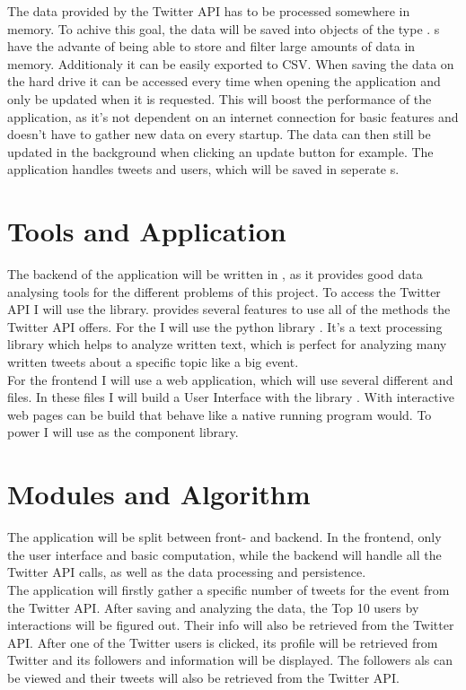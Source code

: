 \documentclass[a4paper,oneside,11pt]{scrreprt}
\begin{document}
The data provided by the Twitter API has to be processed somewhere in memory. To achive this goal, the data will be saved into objects of the  type . s have the advante of being able to store and filter large amounts of data in memory. Additionaly it can be easily exported to CSV. When saving the data on the hard drive it can be accessed every time when opening the application and only be updated when it is requested. This will boost the performance of the application, as it's not dependent on an internet connection for basic features and doesn't have to gather new data on every startup. The data can then still be updated in the background when clicking an update button for example. The application handles tweets and users, which will be saved in seperate s.

\section{Tools and Application}

The backend of the application will be written in , as it provides good data analysing tools for the different problems of this project. To access the Twitter API I will use the  library.  provides several features to use all of the methods the Twitter API offers. For the  I will use the python library . It's a text processing library which helps to analyze written text, which is perfect for analyzing many written tweets about a specific topic like a big event.\\

For the frontend I will use a web application, which will use several different  and  files. In these files I will build a User Interface with the library . With  interactive web pages can be build that behave like a native running program would. To power  I will use  as the component library. 

\section{Modules and Algorithm}

The application will be split between front- and backend. In the frontend, only the user interface and basic computation, while the backend will handle all the Twitter API calls, as well as the data processing and persistence. \\

The application will firstly gather a specific number of tweets for the event from the Twitter API. After saving and analyzing the data, the Top 10 users by interactions will be figured out. Their info will also be retrieved from the Twitter API. After one of the Twitter users is clicked, its profile will be retrieved from Twitter and its followers and information will be displayed. The followers als can be viewed and their tweets will also be retrieved from the Twitter API.
\end{document}
